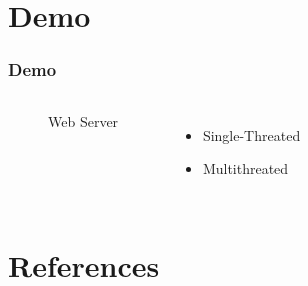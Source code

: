 \documentclass{beamer}
\begin{document}
\section{Demo}

\begin{frame}
\frametitle{Demo}

\begin{columns}[c] %

  \begin{figure}
    \centering
  \caption{Web Server}
  \end{figure}

\begin{itemize}
\item Single-Threated
\item Multithreated
\end{itemize}

\end{columns}

\end{frame}

\section{References}
\end{document}
